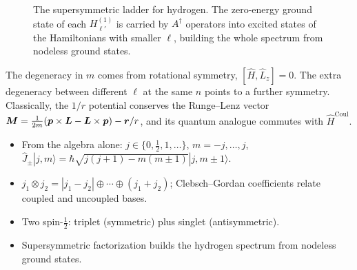 \begin{figure}[ht]
\centering
{}
\caption{The supersymmetric ladder for hydrogen. The zero-energy ground state of each $H^{(1)}_{\ell'}$ is carried by $A^\dagger$ operators into excited states of the Hamiltonians with smaller $\ell$, building the whole spectrum from nodeless ground states.}
\end{figure}

\begin{fact}
The degeneracy in $m$ comes from rotational symmetry, $[\hat{H},\hat{L}_z] = 0$. The extra degeneracy between different $\ell$ at the same $n$ points to a further symmetry. Classically, the $1/r$ potential conserves the Runge--Lenz vector $\vect{M} = \frac{1}{2m}(\lvect{p}\times\vect{L} - \vect{L}\times\lvect{p}) - \lvect{r}/r$, and its quantum analogue commutes with $\hat{H}^{\text{Coul}}$.
\end{fact}

\begin{fact}
\leavevmode
\begin{itemize}
\item From the algebra alone: $j\in\{0,\frac12,1,\ldots\}$, $m = -j,\ldots,j$, $\hat{J}_\pm|j,m\rangle = \hbar\sqrt{j(j+1)-m(m\pm1)}|j,m\pm1\rangle$.
\item $j_1\otimes j_2 = |j_1-j_2|\oplus\cdots\oplus(j_1+j_2)$; Clebsch--Gordan coefficients relate coupled and uncoupled bases.
\item Two spin-$\frac12$: triplet (symmetric) plus singlet (antisymmetric).
\item Supersymmetric factorization builds the hydrogen spectrum from nodeless ground states.
\end{itemize}
\end{fact}
